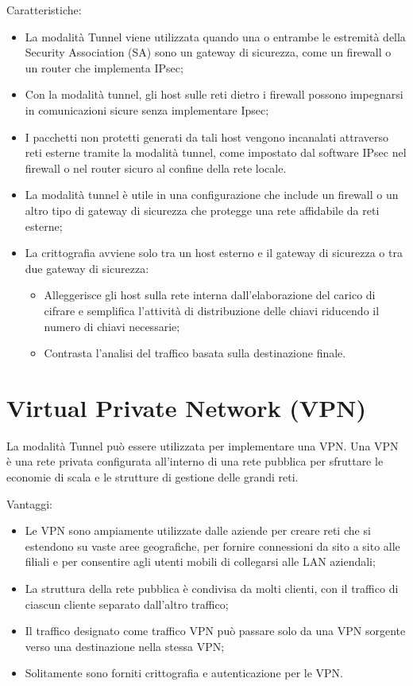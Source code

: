 Caratteristiche:
\begin{itemize}
    \item La modalità Tunnel viene utilizzata quando una o entrambe le estremità della Security Association (SA) sono un gateway di sicurezza, come un firewall o un router che implementa IPsec;
	\item Con la modalità tunnel, gli host sulle reti dietro i firewall possono impegnarsi in comunicazioni sicure senza implementare Ipsec;
	\item I pacchetti non protetti generati da tali host vengono incanalati attraverso reti esterne tramite la modalità tunnel, come impostato dal software IPsec nel firewall o nel router sicuro al confine della rete locale.
	\item La modalità tunnel è utile in una configurazione che include un firewall o un altro tipo di gateway di sicurezza che protegge una rete affidabile da reti esterne;
	\item La crittografia avviene solo tra un host esterno e il gateway di sicurezza o tra due gateway di sicurezza:
	\begin{itemize}
	    \item Alleggerisce gli host sulla rete interna dall'elaborazione del carico di cifrare e semplifica l'attività di distribuzione delle chiavi riducendo il numero di chiavi necessarie;
		\item Contrasta l'analisi del traffico basata sulla destinazione finale.
	\end{itemize}
\end{itemize}

\section{Virtual Private Network (VPN)}

La modalità Tunnel può essere utilizzata per implementare una VPN. Una VPN è una rete privata configurata all'interno di una rete pubblica per sfruttare le economie di scala e le strutture di gestione delle grandi reti.

Vantaggi:
\begin{itemize}
    \item Le VPN sono ampiamente utilizzate dalle aziende per creare reti che si estendono su vaste aree geografiche, per fornire connessioni da sito a sito alle filiali e per consentire agli utenti mobili di collegarsi alle LAN aziendali;
	\item La struttura della rete pubblica è condivisa da molti clienti, con il traffico di ciascun cliente separato dall'altro traffico;
	\item Il traffico designato come traffico VPN può passare solo da una VPN sorgente verso una destinazione nella stessa VPN;
	\item Solitamente sono forniti crittografia e autenticazione per le VPN.
\end{itemize}

